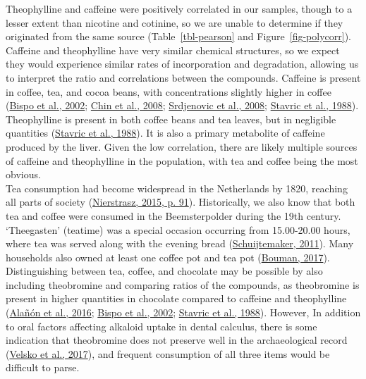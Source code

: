 \documentclass[
  b5paper,
]{book}
\begin{document}
Theophylline and caffeine were positively correlated in our samples,
though to a lesser extent than nicotine and cotinine, so we are unable
to determine if they originated from the same source
(Table~\ref{tbl-pearson} and Figure~\ref{fig-polycorr}). Caffeine and
theophylline have very similar chemical structures, so we expect they
would experience similar rates of incorporation and degradation,
allowing us to interpret the ratio and correlations between the
compounds. Caffeine is present in coffee, tea, and cocoa beans, with
concentrations slightly higher in coffee
(\protect\hyperlink{ref-bispoSimultaneousDetermination2002}{Bispo et
al., 2002}; \protect\hyperlink{ref-chinCaffeineContent2008}{Chin et al.,
2008}; \protect\hyperlink{ref-srdjenovicSimultaneousHPLC2008}{Srdjenovic
et al., 2008};
\protect\hyperlink{ref-stavricVariabilityCaffeine1988}{Stavric et al.,
1988}). Theophylline is present in both coffee beans and tea leaves, but
in negligible quantities
(\protect\hyperlink{ref-stavricVariabilityCaffeine1988}{Stavric et al.,
1988}). It is also a primary metabolite of caffeine produced by the
liver. Given the low correlation, there are likely multiple sources of
caffeine and theophylline in the population, with tea and coffee being
the most obvious.\\
Tea consumption had become widespread in the Netherlands by 1820,
reaching all parts of society
(\protect\hyperlink{ref-nierstraszTeaTrade2015}{Nierstrasz, 2015, p.
91}). Historically, we also know that both tea and coffee were consumed
in the Beemsterpolder during the 19th century. `Theegasten' (teatime)
was a special occasion occurring from 15.00-20.00 hours, where tea was
served along with the evening bread
(\protect\hyperlink{ref-schuijtemakerTeTheegasten2011}{Schuijtemaker,
2011}). Many households also owned at least one coffee pot and tea pot
(\protect\hyperlink{ref-boumanBegravenis2017}{Bouman, 2017}).
Distinguishing between tea, coffee, and chocolate may be possible by
also including theobromine and comparing ratios of the compounds, as
theobromine is present in higher quantities in chocolate compared to
caffeine and theophylline
(\protect\hyperlink{ref-alanonAssessmentFlavanol2016}{Alañón et al.,
2016}; \protect\hyperlink{ref-bispoSimultaneousDetermination2002}{Bispo
et al., 2002};
\protect\hyperlink{ref-stavricVariabilityCaffeine1988}{Stavric et al.,
1988}). However, In addition to oral factors affecting alkaloid uptake
in dental calculus, there is some indication that theobromine does not
preserve well in the archaeological record
(\protect\hyperlink{ref-velskoDentalCalculus2017}{Velsko et al., 2017}),
and frequent consumption of all three items would be difficult to parse.
\end{document}
